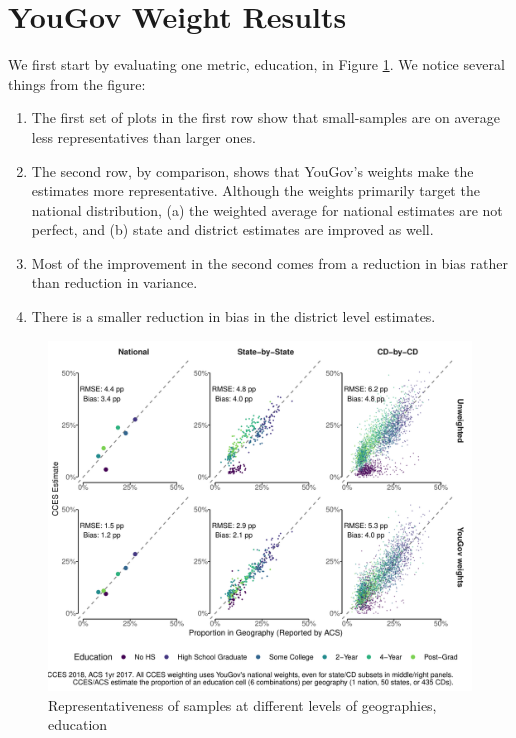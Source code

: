 \documentclass[11pt]{article}
\begin{document}
\newpage

\section*{YouGov Weight Results}

We first start by evaluating one metric, education, in Figure \ref{fig:cellfrac-ed}. We notice several things from the figure:

\smallskip

\begin{enumerate}
\item The first set of plots in the first row show that small-samples are on average less representatives than larger ones.
\item The second row, by comparison, shows that YouGov's weights make the estimates more representative. Although the weights primarily target the national distribution, (a) the weighted average for national estimates are not perfect, and (b) state and district estimates are improved as well. 
\item Most of the improvement in the second comes from a reduction in bias rather than reduction in variance. 
\item There is a smaller reduction in bias in the district level estimates.
\end{enumerate}

\begin{figure}[tbph]
\caption{Representativeness of samples at different levels of geographies, education \label{fig:cellfrac-ed}}
\centering
\includegraphics[width = \textwidth]{figures/educfrac-comparisons.pdf}
\end{figure}
\end{document}
